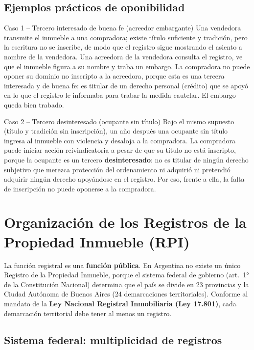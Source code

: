 \documentclass[12pt,oneside]{book}
\begin{document}
\subsection{Ejemplos prácticos de oponibilidad}

\begin{example}{Caso 1 -- Tercero interesado de buena fe (acreedor embargante)}
Una vendedora transmite el inmueble a una compradora; existe título suficiente y tradición, pero la escritura no se inscribe, de modo que el registro sigue mostrando el asiento a nombre de la vendedora. Una acreedora de la vendedora consulta el registro, ve que el inmueble figura a su nombre y traba un embargo. La compradora no puede oponer su dominio no inscripto a la acreedora, porque esta es una tercera interesada y de buena fe: es titular de un derecho personal (crédito) que se apoyó en lo que el registro le informaba para trabar la medida cautelar. El embargo queda bien trabado.
\end{example}

\begin{example}{Caso 2 -- Tercero desinteresado (ocupante sin título)}
Bajo el mismo supuesto (título y tradición sin inscripción), un año después una ocupante sin título ingresa al inmueble con violencia y desaloja a la compradora. La compradora puede iniciar acción reivindicatoria a pesar de que su título no está inscripto, porque la ocupante es un tercero \textbf{desinteresado}: no es titular de ningún derecho subjetivo que merezca protección del ordenamiento ni adquirió ni pretendió adquirir ningún derecho apoyándose en el registro. Por eso, frente a ella, la falta de inscripción no puede oponerse a la compradora.
\end{example}

\section{Organización de los Registros de la Propiedad Inmueble (RPI)}

La función registral es una \textbf{función pública}. En Argentina no existe un único Registro de la Propiedad Inmueble, porque el sistema federal de gobierno (art.\ 1° de la Constitución Nacional) determina que el país se divide en 23 provincias y la Ciudad Autónoma de Buenos Aires (24 demarcaciones territoriales). Conforme al mandato de la \textbf{Ley Nacional Registral Inmobiliaria (Ley 17.801)}, cada demarcación territorial debe tener al menos un registro.

\subsection{Sistema federal: multiplicidad de registros}
\end{document}
